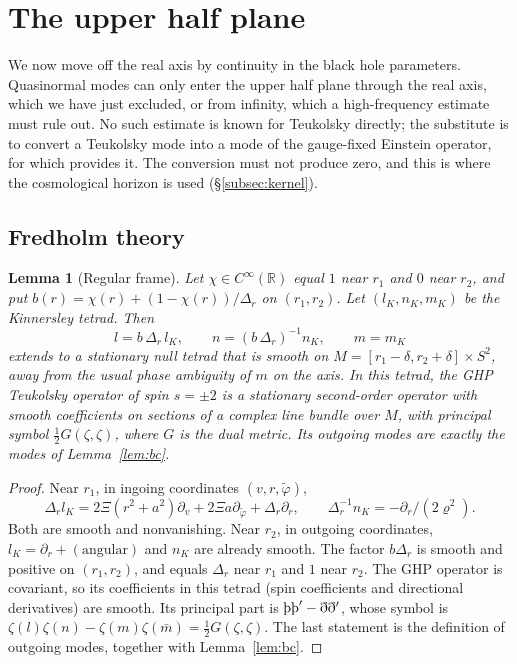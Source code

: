 \documentclass[11pt]{amsart}
\newtheorem{lemma}[theorem]{Lemma}
\theoremstyle{definition}
\theoremstyle{remark}
\numberwithin{equation}{section}
\newcommand{\Th}{\text{\th}}
\newcommand{\R}{\mathbb{R}}
\begin{document}
\section{The upper half plane}\label{sec:uhp}
We now move off the real axis by continuity in the black hole parameters. Quasinormal modes can only enter the
upper half plane through the real axis, which we have just excluded, or from infinity, which a high-frequency
estimate must rule out. No such estimate is known for Teukolsky directly; the substitute is to convert a Teukolsky
mode into a mode of the gauge-fixed Einstein operator, for which \cite{HPV25} provides it. The conversion must not
produce zero, and this is where the cosmological horizon is used (\S\ref{subsec:kernel}).


\subsection{Fredholm theory}
\begin{lemma}[Regular frame]\label{lem:regframe}
Let $\chi\in C^\infty(\R)$ equal $1$ near $r_1$ and $0$ near $r_2$, and put $b(r)=\chi(r)+(1-\chi(r))/\Delta_r$ on
$(r_1,r_2)$. Let $(l_K,n_K,m_K)$ be the Kinnersley tetrad. Then
\[
l=b\,\Delta_r\,l_K,\qquad n=(b\,\Delta_r)^{-1}n_K,\qquad m=m_K
\]
extends to a stationary null tetrad that is smooth on $M=[r_1-\delta,r_2+\delta]\times S^2$, away from the usual phase
ambiguity of $m$ on the axis. In this tetrad, the GHP Teukolsky operator of spin $s=\pm2$ is a stationary second-order
operator with smooth coefficients on sections of a complex line bundle over $M$, with principal symbol
$\frac12G(\zeta,\zeta)$, where $G$ is the dual metric. Its outgoing modes are exactly the modes of
Lemma~\ref{lem:bc}.
\end{lemma}

\begin{proof}
Near $r_1$, in ingoing coordinates $(v,r,\tilde\varphi)$,
\[
\Delta_rl_K=2\Xi(r^2+a^2)\partial_v+2\Xi a\partial_{\tilde\varphi}+\Delta_r\partial_r,\qquad \Delta_r^{-1}n_K=-\partial_r/(2\varrho^2).
\]
Both are smooth and nonvanishing. Near $r_2$, in outgoing coordinates, $l_K=\partial_r+(\text{angular})$ and $n_K$ are
already smooth. The factor $b\Delta_r$ is smooth and positive on $(r_1,r_2)$, and equals $\Delta_r$ near $r_1$ and $1$
near $r_2$. The GHP operator is covariant, so its coefficients in this tetrad (spin coefficients and directional
derivatives) are smooth. Its principal part is $\Th\Th'-\eth\eth'$, whose symbol is
$\zeta(l)\zeta(n)-\zeta(m)\zeta(\bar m)=\frac12G(\zeta,\zeta)$. The last statement is the definition of outgoing
modes, together with Lemma~\ref{lem:bc}.
\end{proof}
\end{document}
